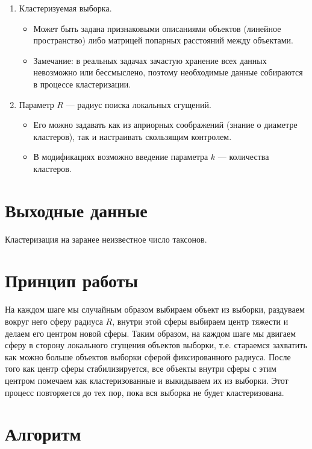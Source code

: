 \begin{enumerate}
    \item Кластеризуемая выборка.
    \begin{itemize}
        \item Может быть задана признаковыми описаниями объектов (линейное пространство) либо матрицей попарных расстояний между объектами.
        \item Замечание: в реальных задачах зачастую хранение всех данных невозможно или бессмыслено, поэтому необходимые данные собираются в процессе кластеризации.
    \end{itemize}
    \item Параметр \( R \) — радиус поиска локальных сгущений.
    \begin{itemize}
        \item Его можно задавать как из априорных соображений (знание о диаметре кластеров), так и настраивать скользящим контролем.
        \item В модификациях возможно введение параметра \( k \) — количества кластеров.
    \end{itemize}
\end{enumerate}

\section*{Выходные данные}

Кластеризация на заранее неизвестное число таксонов.

\section*{Принцип работы}

На каждом шаге мы случайным образом выбираем объект из выборки, раздуваем вокруг него сферу радиуса \( R \), внутри этой сферы выбираем центр тяжести и делаем его центром новой сферы. Таким образом, на каждом шаге мы двигаем сферу в сторону локального сгущения объектов выборки, т.е. стараемся захватить как можно больше объектов выборки сферой фиксированного радиуса. После того как центр сферы стабилизируется, все объекты внутри сферы с этим центром помечаем как кластеризованные и выкидываем их из выборки. Этот процесс повторяется до тех пор, пока вся выборка не будет кластеризована.

\section*{Алгоритм}

